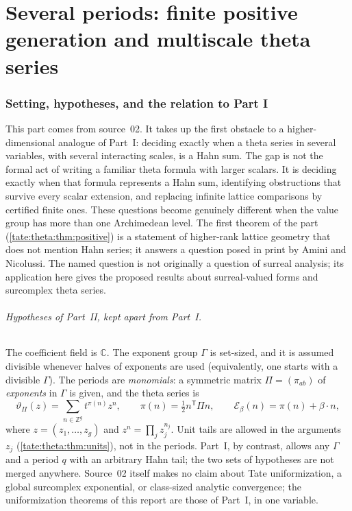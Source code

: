 \documentclass[11pt,letterpaper]{article}
\theoremstyle{definition}
\newcommand{\C}{\mathbb C}
\newcommand{\Z}{\mathbb Z}
\newcommand{\cE}{\mathcal E}
\begin{document}
\part{Several periods: finite positive generation and multiscale theta
series}\label{tate:part:theta}

\section{Setting, hypotheses, and the relation to Part I}\label{tate:theta:sec:setting}

This part comes from source~02. It takes up the first obstacle to a
higher-dimensional analogue of Part~I: deciding exactly when a theta series
in several variables, with several interacting scales, is a Hahn sum. The
gap is not the formal act of writing a familiar theta formula with larger
scalars. It is deciding exactly when that formula represents a Hahn sum,
identifying obstructions that survive every scalar extension, and replacing
infinite lattice comparisons by certified finite ones. These questions
become genuinely different when the value group has more than one
Archimedean level. The first theorem of the part
(\cref{tate:theta:thm:positive}) is a statement of higher-rank lattice
geometry that does not mention Hahn series; it answers a question posed in
print by Amini and Nicolussi. The named question is not originally a
question of surreal analysis; its application here gives the proposed
results about surreal-valued forms and surcomplex theta series.

\paragraph{Hypotheses of Part~II, kept apart from Part~I.}
The coefficient field is $\C$. The exponent group $\Gamma$ is set-sized,
and it is assumed divisible whenever halves of exponents are used
(equivalently, one starts with a divisible $\Gamma$). The periods are
\emph{monomials}: a symmetric matrix $\Pi=(\pi_{ab})$ of \emph{exponents}
in $\Gamma$ is given, and the theta series is
\begin{equation}
 \vartheta_\Pi(z)=\sum_{n\in\Z^g}t^{\pi(n)}z^n,\qquad
 \pi(n)=\tfrac12n^{\mathsf T}\Pi n,\qquad
 \cE_\beta(n)=\pi(n)+\beta\cdot n,\label{tate:theta:eq:energyintro}
\end{equation}
where $z=(z_1,\dots,z_g)$ and $z^n=\prod_jz_j^{n_j}$. Unit tails are allowed
in the arguments $z_j$ (\cref{tate:theta:thm:units}), not in the periods.
Part~I, by contrast, allows any $\Gamma$ and a period $q$ with an arbitrary
Hahn tail; the two sets of hypotheses are not merged anywhere. Source~02
itself makes no claim about Tate uniformization, a global surcomplex
exponential, or class-sized analytic convergence; the uniformization
theorems of this report are those of Part~I, in one variable.
\end{document}

